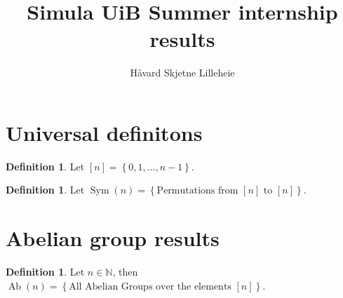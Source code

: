 \documentclass[a4paper, 12pt, english]{article}
\title{Simula UiB Summer internship results}
\author{Håvard Skjetne Lilleheie}
\theoremstyle{plain}
\theoremstyle{definition}
\newtheorem{definition}[theorem]{Definition}
\newcommand{\Nb}{\mathbb{N}}
\newcommand{\set}[1]{ \left\{ #1 \right\} } %
\DeclareMathOperator{\Ab}{Ab}
\DeclareMathOperator{\Sym}{Sym}
\begin{document}
\maketitle

\section{Universal definitons}

\begin{definition}
    Let \( [n] = \set{0, 1, \dots, n-1} \).
\end{definition}

\begin{definition}
    Let \( \Sym(n) = \set{\text{Permutations from } [n] \text{ to } [n]} \).
\end{definition}

\section{Abelian group results}

\begin{definition}
    Let \( n \in \Nb \), then \( \Ab(n) = \set{ \text{All Abelian Groups over the elements } [n]} \).
\end{definition}
\end{document}
